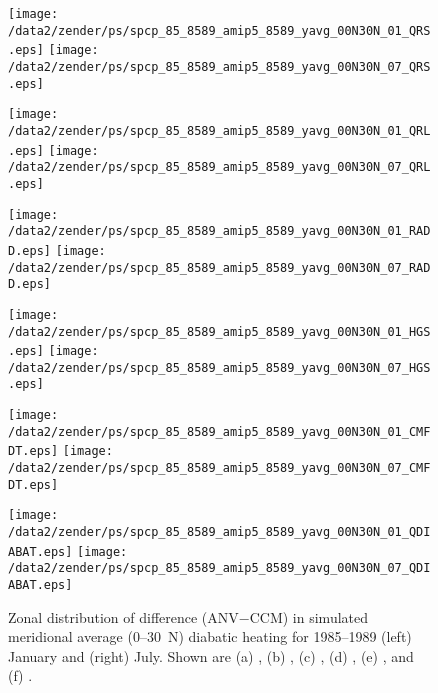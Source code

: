 \documentclass[twocolumn,final]{article}
\begin{document}
\begin{figure*}
\texttt{[image: /data2/zender/ps/spcp\_85\_8589\_amip5\_8589\_yavg\_00N30N\_01\_QRS.eps]}
\texttt{[image: /data2/zender/ps/spcp\_85\_8589\_amip5\_8589\_yavg\_00N30N\_07\_QRS.eps]}

\texttt{[image: /data2/zender/ps/spcp\_85\_8589\_amip5\_8589\_yavg\_00N30N\_01\_QRL.eps]}
\texttt{[image: /data2/zender/ps/spcp\_85\_8589\_amip5\_8589\_yavg\_00N30N\_07\_QRL.eps]}

\texttt{[image: /data2/zender/ps/spcp\_85\_8589\_amip5\_8589\_yavg\_00N30N\_01\_RADD.eps]}
\texttt{[image: /data2/zender/ps/spcp\_85\_8589\_amip5\_8589\_yavg\_00N30N\_07\_RADD.eps]}

\texttt{[image: /data2/zender/ps/spcp\_85\_8589\_amip5\_8589\_yavg\_00N30N\_01\_HGS.eps]}
\texttt{[image: /data2/zender/ps/spcp\_85\_8589\_amip5\_8589\_yavg\_00N30N\_07\_HGS.eps]}

\texttt{[image: /data2/zender/ps/spcp\_85\_8589\_amip5\_8589\_yavg\_00N30N\_01\_CMFDT.eps]}
\texttt{[image: /data2/zender/ps/spcp\_85\_8589\_amip5\_8589\_yavg\_00N30N\_07\_CMFDT.eps]}

\texttt{[image: /data2/zender/ps/spcp\_85\_8589\_amip5\_8589\_yavg\_00N30N\_01\_QDIABAT.eps]}
\texttt{[image: /data2/zender/ps/spcp\_85\_8589\_amip5\_8589\_yavg\_00N30N\_07\_QDIABAT.eps]}
\caption[Zonal distribution of difference (ANV$-$CCM) in simulated
meridional average (0--30~\degreee N) diabatic heating for 1985--1989
January and July.]{
Zonal distribution of difference (ANV$-$CCM) in simulated meridional
average (0--30~\degreee N) diabatic heating for 1985--1989 (left)
January and (right) July. 
Shown are (a) \QRL, (b) \QRS, (c) \QR, (d) \QLS, (e) \QC, and (f) \QT.
\label{fig:yavg_00N30N_8589_QT}}
\end{figure*}
\clearpage
\end{document}
